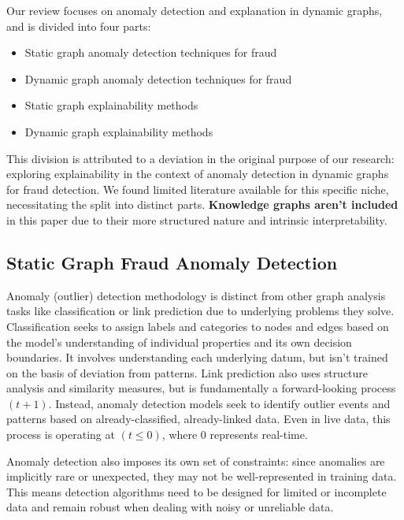 \noindent Our review focuses on anomaly detection and explanation in dynamic graphs, and is divided into four parts:
\begin{itemize}
    \item Static graph anomaly detection techniques for fraud
    \item Dynamic graph anomaly detection techniques for fraud
    \item Static graph explainability methods
    \item Dynamic graph explainability methods
\end{itemize}

This division is attributed to a deviation in the original purpose of our research: exploring explainability in the context of anomaly detection in dynamic graphs for fraud detection. We found limited literature available for this specific niche, necessitating the split into distinct parts. \textbf{Knowledge graphs aren't included} in this paper due to their more structured nature and intrinsic interpretability.

\subsection{Static Graph Fraud Anomaly Detection}
Anomaly (outlier) detection methodology is distinct from other graph analysis tasks like classification or link prediction due to underlying problems they solve. Classification seeks to assign labels and categories to nodes and edges based on the model's understanding of individual properties and its own decision boundaries. It involves understanding each underlying datum, but isn't trained on the basis of deviation from patterns. Link prediction also uses structure analysis and similarity measures, but is fundamentally a forward-looking process \((t+1)\). Instead, anomaly detection models seek to identify outlier events and patterns based on already-classified, already-linked data. Even in live data, this process is operating at \((t\le0)\), where \(0\) represents real-time.

Anomaly detection also imposes its own set of constraints: since anomalies are implicitly rare or unexpected, they may not be well-represented in training data. This means detection algorithms need to be designed for limited or incomplete data and remain robust when dealing with noisy or unreliable data.

